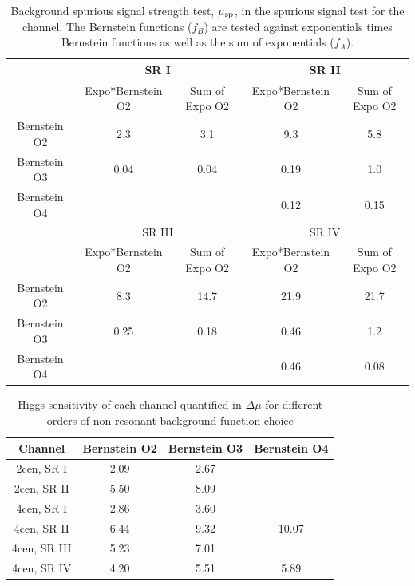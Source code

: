 \begin{table}[htbp]
\centering
\caption{Background spurious signal strength test, $\mu_{\rm sp}$, in the spurious signal test for the \fourcentral channel. The Bernstein functions ($f_B$) are tested against exponentials times Bernstein functions as well as the sum of exponentials ($f_A$).}
\label{tab:spurious-test-4cen}
\begin{tabular}{|c|c|c|c|c|}
\hline
             & \multicolumn{2}{c|}{SR I}                  & \multicolumn{2}{c|}{SR II}                 \\ \hline
             & Expo*Bernstein O2 & Sum of Expo O2 & Expo*Bernstein O2 & Sum of Expo O2 \\ \hline
Bernstein O2 & 2.3               & 3.1                    & 9.3               & 5.8                    \\ \hline
Bernstein O3 & 0.04              & 0.04                   & 0.19              & 1.0                    \\ \hline
Bernstein O4 &                   &                        & 0.12              & 0.15                   \\ \hline
             & \multicolumn{2}{c|}{SR III}                & \multicolumn{2}{c|}{SR IV}                 \\ \hline
             & Expo*Bernstein O2 & Sum of Expo O2 & Expo*Bernstein O2 & Sum of Expo O2 \\ \hline
Bernstein O2 & 8.3               & 14.7                   & 21.9              & 21.7                   \\ \hline
Bernstein O3 & 0.25              & 0.18                   & 0.46              & 1.2                    \\ \hline
Bernstein O4 &                   &                        & 0.46              & 0.08                   \\ \hline
\end{tabular}
\end{table}


\begin{table}[htbp]
\centering
\caption{Higgs sensitivity of each channel quantified in $\Delta \mu$ for different orders of non-resonant background function choice}
\label{tab:perchannel_sensitivity}
\begin{tabular}{|c|c|c|c|}
\hline
Channel      & Bernstein O2 & Bernstein O3 & Bernstein O4 \\ \hline
2cen, SR I   & 2.09         & 2.67         &              \\ \hline
2cen, SR II  & 5.50         & 8.09         &              \\ \hline
4cen, SR I   & 2.86         & 3.60         &              \\ \hline
4cen, SR II  & 6.44         & 9.32         & 10.07        \\ \hline
4cen, SR III & 5.23         & 7.01         &              \\ \hline
4cen, SR IV  & 4.20         & 5.51         & 5.89         \\ \hline
\end{tabular}
\end{table}


